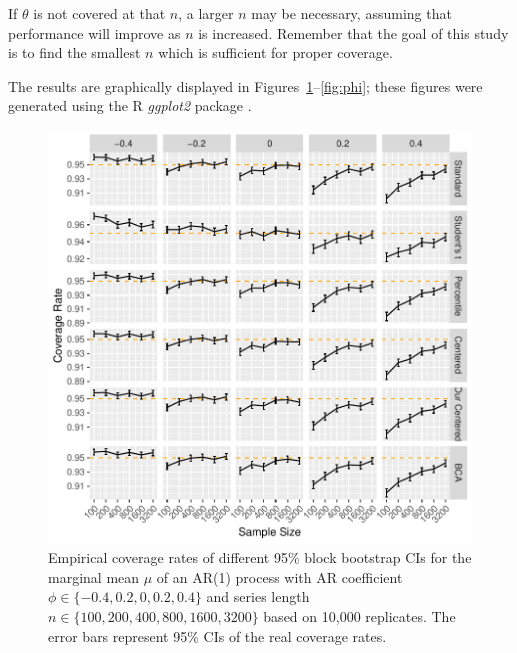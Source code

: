 \documentclass[12pt, letterpaper, titlepage]{article}
\begin{document}
If $\theta$ is not covered at that $n$, a larger $n$ may be
necessary, assuming that performance will improve as $n$ is increased.
Remember that
the goal of this study is to find the smallest $n$ which is sufficient for
proper coverage.




The results are graphically displayed in Figures~\ref{fig:mu}--\ref{fig:phi};
these figures were generated using the R \textsl{ggplot2} package
\citep{ggplot2}.




\begin{figure}[tbp]
  \centering
  \includegraphics[width=\textwidth]{figures/plot_mu}
  \caption{Empirical coverage rates of different 95\% block bootstrap CIs for
    the marginal mean $\mu$ of an AR(1) process with AR coefficient
    $\phi \in \{-0.4, 0.2, 0, 0.2, 0.4\}$ and series length
    $n \in \{100, 200, 400, 800, 1600, 3200\}$ based on 10,000 replicates.
    The error bars represent 95\% CIs of the real coverage rates.}
  \label{fig:mu}
\end{figure}
\end{document}
